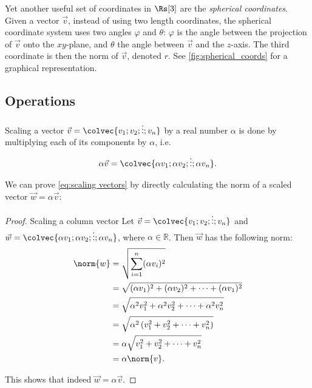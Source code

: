 Yet another useful set of coordinates in $\Rs[3]$ are the \emph{spherical coordinates}. Given a vector $\vec{v}$, instead of using two length coordinates, the spherical coordinate system uses two angles $\varphi$ and $\theta$: $\varphi$ is the angle between the projection of $\vec{v}$ onto the $xy$-plane, and $\theta$ the angle between $\vec{v}$ and the $z$-axis. The third coordinate is then the norm of $\vec{v}$, denoted $r$. See \autoref{fig:spherical_coords} for a graphical representation.


\subsection{Operations}
Scaling a vector $\vec{v}=\colvec{v_{1};v_{2};\vdots;v_{n}}$ by a real number $\alpha$ is done by multiplying each of its components by $\alpha$, i.e.
\begin{equation}
	\alpha\vec{v} = \colvec{\alpha v_{1};\alpha v_{2};\vdots;\alpha v_{n}}.
	\label{eq:scaling vectors}
\end{equation}

We can prove \autoref{eq:scaling vectors} by directly calculating the norm of a scaled vector $\vec{w}=\alpha\vec{v}$:
\begin{proof}{Scaling a column vector}{}
	Let $\vec{v}=\colvec{v_{1};v_{2};\vdots;v_{n}}$ and $\vec{w}=\colvec{\alpha v_{1};\alpha v_{2};\vdots;\alpha v_{n}}$, where $\alpha\in\mathbb{R}$. Then $\vec{w}$ has the following norm:
	\begin{align*}
		\norm{w} &= \sqrt{\sum\limits_{i=1}^{n}(\alpha v_{i})^{2}}\\
		&= \sqrt{(\alpha v_{1})^{2} + (\alpha v_{2})^{2} + \dots + (\alpha v_{1})^{2}}\\
		&= \sqrt{\alpha^{2}v_{1}^{2} + \alpha^{2}v_{2}^{2} + \dots + \alpha^{2}v_{n}^{2}}\\
		&= \sqrt{\alpha^{2}\left( v_{1}^{2} + v_{2}^{2} + \dots + v_{n}^{2} \right)}\\
		&= \alpha\sqrt{v_{1}^{2} + v_{2}^{2} + \dots + v_{n}^{2}}\\
		&= \alpha\norm{v}.
	\end{align*}

	This shows that indeed $\vec{w}=\alpha\vec{v}$.
\end{proof}

